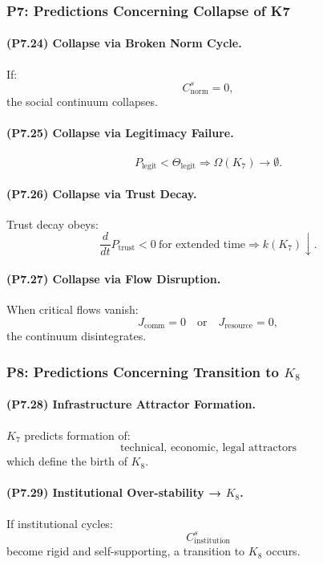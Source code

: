 \subsubsection{P7: Predictions Concerning Collapse of K7}

\paragraph{(P7.24) Collapse via Broken Norm Cycle.}
If:
\[
C_{\mathrm{norm}}^s = 0,
\]
the social continuum collapses.

\paragraph{(P7.25) Collapse via Legitimacy Failure.}
\[
P_{\mathrm{legit}} < \Theta_{\mathrm{legit}}
\Rightarrow
\Omega(K_7) \to \emptyset.
\]

\paragraph{(P7.26) Collapse via Trust Decay.}
Trust decay obeys:
\[
\frac{d}{dt} P_{\mathrm{trust}} < 0 \ \text{for extended time}
\Rightarrow
k(K_7) \downarrow.
\]

\paragraph{(P7.27) Collapse via Flow Disruption.}
When critical flows vanish:
\[
J_{\mathrm{comm}} = 0
\quad \text{or} \quad
J_{\mathrm{resource}} = 0,
\]
the continuum disintegrates.

\subsubsection{P8: Predictions Concerning Transition to \texorpdfstring{$K_8$}{K_8}}

\paragraph{(P7.28) Infrastructure Attractor Formation.}
$K_7$ predicts formation of:
\[
\text{technical, economic, legal attractors}
\]
which define the birth of $K_8$.

\paragraph{(P7.29) Institutional Over-stability → \texorpdfstring{$K_8$}{K_8}.}
If institutional cycles:
\[
C_{\mathrm{institution}}^s
\]
become rigid and self-supporting, a transition to $K_8$ occurs.


